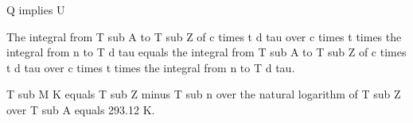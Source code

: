 Q implies U

The integral from T sub A to T sub Z of c times t d tau over c times t times the integral from n to T d tau equals the integral from T sub A to T sub Z of c times t d tau over c times t times the integral from n to T d tau.

T sub M K equals T sub Z minus T sub n over the natural logarithm of T sub Z over T sub A equals 293.12 K.